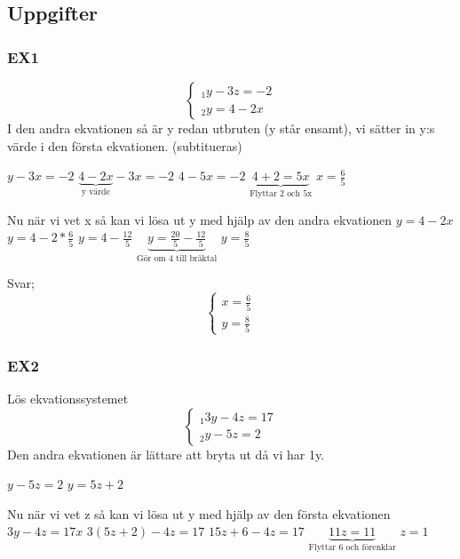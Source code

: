 \documentclass[a4paper,10pt]{article}
\begin{document}
\begin{flushleft}
\subsection{Uppgifter}
\subsubsection{EX1}
\[
\begin{cases}
_1  y-3z=-2\\
_2  y=4-2x
\end{cases}
\]
I den andra ekvationen så är y redan utbruten (y står ensamt), vi sätter in y:s värde i den första ekvationen. (subtitueras)

$y-3x=-2$\newline
$\underbrace{4-2x}_{\text{y värde}}-3x=-2$\newline
$4-5x=-2$\newline
$\underbrace{4+2=5x}_{\text{Flyttar 2 och 5x}}$\newline
$x=\frac{6}{5}$

Nu när vi vet x så kan vi lösa ut y med hjälp av den andra ekvationen
$y = 4-2x$\newline
$y = 4-2*\frac{6}{5}$\newline
$y = 4 - \frac{12}{5}$\newline
$\underbrace{y = \frac{20}{5}-\frac{12}{5}}_{\text{Gör om 4 till bråktal}}$\newline
$y = \frac{8}{5}$

Svar;
\[
\begin{cases}
x = \frac{6}{5}\\
y = \frac{8}{5}
\end{cases}
\]

\subsubsection{EX2}
Lös ekvationssystemet
\[
\begin{cases}
_1  3y-4z=17\\
_2  y-5z=2
\end{cases}
\]
Den andra ekvationen är lättare att bryta ut då vi har 1y.

$y-5z=2$\newline
$y = 5z+2$

Nu när vi vet z så kan vi lösa ut y med hjälp av den första ekvationen
$3y-4z=17x$\newline
$3(5z+2)-4z=17$\newline
$15z+6-4z=17$\newline
$\underbrace{11z=11}_{\text{Flyttar 6 och förenklar}}$\newline
$z = 1$


\end{flushleft}
\end{document}
